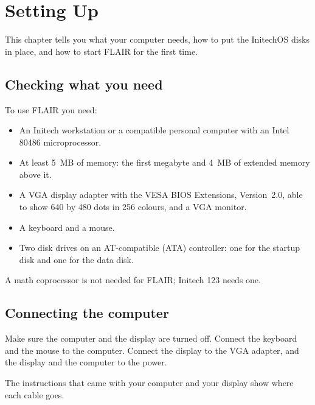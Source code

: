 \chapter{Setting Up}
\IsThisGoodForTheCompany

This chapter tells you what your computer needs, how to put the InitechOS
disks in place, and how to start FLAIR for the first time.

\section{Checking what you need}
To use FLAIR you need:
\begin{itemize}
\item An Initech workstation or a compatible personal computer with an
  Intel 80486 microprocessor.
\item At least 5~MB of memory: the first megabyte and 4~MB of extended
  memory above it.
\item A VGA display adapter with the VESA BIOS Extensions, Version~2.0,
  able to show 640 by 480 dots in 256 colours, and a VGA monitor.
\item A keyboard and a mouse.
\item Two disk drives on an AT-compatible (ATA) controller: one for the
  startup disk and one for the data disk.
\end{itemize}
A math coprocessor is not needed for FLAIR; Initech 123 needs one.

\section{Connecting the computer}
\begin{TaskSteps}
\Step Make sure the computer and the display are turned off.
\Step Connect the keyboard and the mouse to the computer.
\Step Connect the display to the VGA adapter, and the display and the
computer to the power.
\end{TaskSteps}
The instructions that came with your computer and your display show where
each cable goes.

